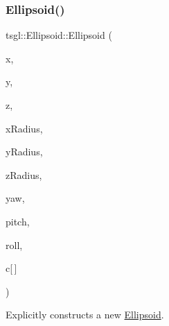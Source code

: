 \subsubsection{\texorpdfstring{Ellipsoid()}{Ellipsoid()}\hspace{0.1cm}{\footnotesize\ttfamily [2/2]}}
{\footnotesize\ttfamily tsgl\+::\+Ellipsoid\+::\+Ellipsoid (\begin{DoxyParamCaption}\item[{float}]{x,  }\item[{float}]{y,  }\item[{float}]{z,  }\item[{G\+Lfloat}]{x\+Radius,  }\item[{G\+Lfloat}]{y\+Radius,  }\item[{G\+Lfloat}]{z\+Radius,  }\item[{float}]{yaw,  }\item[{float}]{pitch,  }\item[{float}]{roll,  }\item[{\hyperlink{structtsgl_1_1_color_float}{Color\+Float}}]{c\mbox{[}$\,$\mbox{]} }\end{DoxyParamCaption})}



Explicitly constructs a new \hyperlink{classtsgl_1_1_ellipsoid}{Ellipsoid}. 

